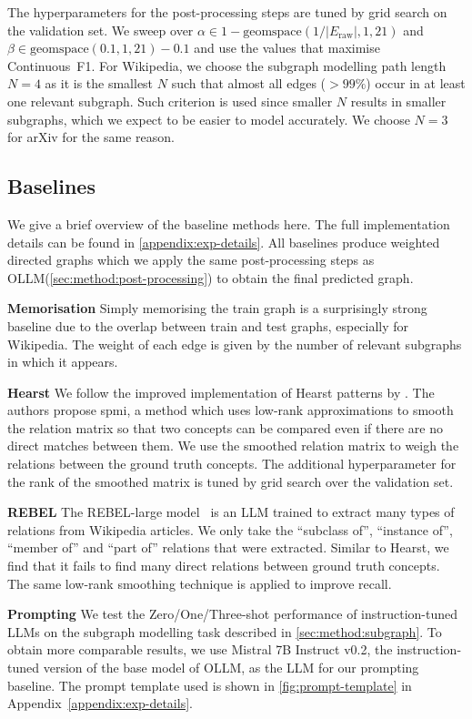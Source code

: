 \documentclass{article}
\newcommand{\name}{{OLLM}\xspace}
\begin{document}
The hyperparameters for the post-processing steps are tuned by grid search on the validation set. We sweep over $\alpha \in 1 - \text{geomspace}(1 / |E_\text{raw}|, 1, 21)$ and $\beta \in \text{geomspace}(0.1, 1, 21) - 0.1$ and use the values that maximise Continuous~F1. For Wikipedia, we choose the subgraph modelling path length $N=4$ as it is the smallest $N$ such that almost all edges ($>99\%$) occur in at least one relevant subgraph. Such criterion is used since smaller $N$ results in smaller subgraphs, which we expect to be easier to model accurately. We choose $N=3$ for arXiv for the same reason.

\subsection{Baselines}

We give a brief overview of the baseline methods here. The full implementation details can be found in \cref{appendix:exp-details}. All baselines produce weighted directed graphs which we apply the same post-processing steps as \name (\cref{sec:method:post-processing}) to obtain the final predicted graph.

\textbf{Memorisation }
Simply memorising the train graph is a surprisingly strong baseline due to the overlap between train and test graphs, especially for Wikipedia. The weight of each edge is given by the number of relevant subgraphs in which it appears.

\textbf{Hearst }
We follow the improved implementation of Hearst patterns by \citet{roller2018hearst}. The authors propose spmi, a method which uses low-rank approximations to smooth the relation matrix so that two concepts can be compared even if there are no direct matches between them. We use the smoothed relation matrix to weigh the relations between the ground truth concepts. The additional hyperparameter for the rank of the smoothed matrix is tuned by grid search over the validation set.

\textbf{REBEL }
The REBEL-large model~\cite{cabot2021rebel} is an LLM trained to extract many types of relations from Wikipedia articles. We only take the ``subclass of'', ``instance of'', ``member of'' and ``part of'' relations that were extracted. Similar to Hearst, we find that it fails to find many direct relations between ground truth concepts. The same low-rank smoothing technique is applied to improve recall.

\textbf{Prompting }
We test the Zero/One/Three-shot performance of instruction-tuned LLMs on the subgraph modelling task described in \cref{sec:method:subgraph}. To obtain more comparable results, we use Mistral 7B Instruct v0.2, the instruction-tuned version of the base model of \name, as the LLM for our prompting baseline. The prompt template used is shown in \cref{fig:prompt-template} in Appendix~\ref{appendix:exp-details}.
\end{document}
